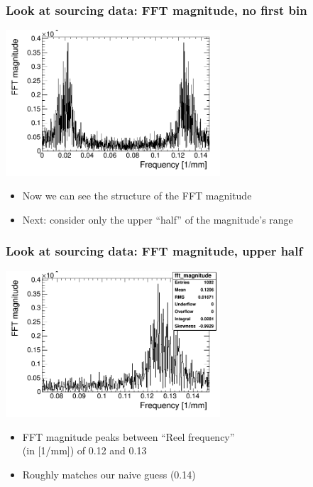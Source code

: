 \documentclass[bigger]{beamer}
\begin{document}
\begin{frame}
\frametitle{Look at sourcing data: FFT magnitude, no first bin}
\label{sec-3-1-7}
\label{sec-3-1-7-1}

\centering
\includegraphics[width=0.6\textwidth]{fig/FFT_magnitude_zeroFirstBin.png}
\begin{itemize}

\item Now we can see the structure of the FFT magnitude
\label{sec-3-1-7-2}%

\item Next: consider only the upper ``half'' of the magnitude's range
\label{sec-3-1-7-3}%
\end{itemize} %
\end{frame}
\begin{frame}
\frametitle{Look at sourcing data: FFT magnitude, upper half}
\label{sec-3-1-8}
\label{sec-3-1-8-1}

\centering
\includegraphics[width=0.6\textwidth]{fig/FFT_magnitude_zeroFirstBin_upperHalf.png}
\begin{itemize}

\item FFT magnitude peaks between ``Reel frequency''\\
\label{sec-3-1-8-2}%
(in [1/mm]) of 0.12 and 0.13 

\item Roughly matches our naive guess (0.14)
\label{sec-3-1-8-3}%
\end{itemize} %
\end{frame}
\end{document}
